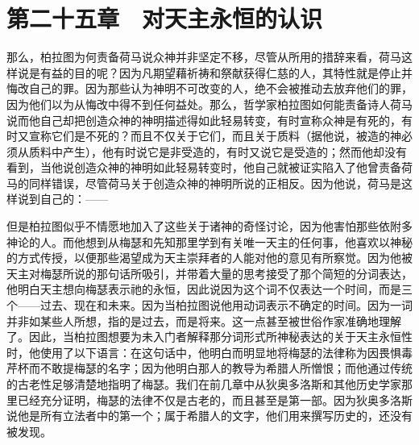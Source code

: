 \par


\section{第二十五章　对天主永恒的认识}

那么，柏拉图为何责备荷马说众神并非坚定不移，尽管从所用的措辞来看，荷马这样说是有益的目的呢？因为凡期望藉祈祷和祭献获得仁慈的人，其特性就是停止并悔改自己的罪。因为那些认为神明不可改变的人，绝不会被推动去放弃他们的罪，因为他们以为从悔改中得不到任何益处。那么，哲学家柏拉图如何能责备诗人荷马说而他自己却把创造众神的神明描述得如此轻易转变，有时宣称众神是有死的，有时又宣称它们是不死的？而且不仅关于它们，而且关于质料（据他说，被造的神必须从质料中产生），他有时说它是非受造的，有时又说它是受造的；然而他却没有看到，当他说创造众神的神明如此轻易转变时，他自己就被证实陷入了他曾责备荷马的同样错误，尽管荷马关于创造众神的神明所说的正相反。因为他说，荷马是这样说到自己的：——\par

\par

但是柏拉图似乎不情愿地加入了这些关于诸神的奇怪讨论，因为他害怕那些依附多神论的人。而他想到从梅瑟和先知那里学到有关唯一天主的任何事，他喜欢以神秘的方式传授，以便那些渴望成为天主崇拜者的人能对他的意见有所察觉。因为他被天主对梅瑟所说的那句话所吸引，并带着大量的思考接受了那个简短的分词表达，他明白天主想向梅瑟表示祂的永恒，因此说因为这个词不仅表达一个时间，而是三个——过去、现在和未来。因为当柏拉图说他用动词表示不确定的时间。因为一词并非如某些人所想，指的是过去，而是将来。这一点甚至被世俗作家准确地理解了。因此，当柏拉图想要为未入门者解释那分词形式所神秘表达的关于天主永恒性时，他使用了以下语言：在这句话中，他明白而明显地将梅瑟的法律称为因畏惧毒芹杯而不敢提梅瑟的名字；因为他明白那人的教导为希腊人所憎恨；而他通过传统的古老性足够清楚地指明了梅瑟。我们在前几章中从狄奥多洛斯和其他历史学家那里已经充分证明，梅瑟的法律不仅是古老的，而且甚至是第一部。因为狄奥多洛斯说他是所有立法者中的第一个；属于希腊人的文字，他们用来撰写历史的，还没有被发现。\par

